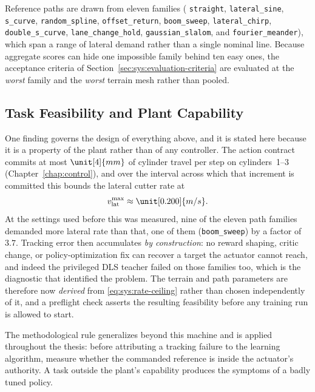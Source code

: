 Reference paths are drawn from eleven families ( \texttt{straight},
\texttt{lateral\_sine}, \texttt{s\_curve}, \texttt{random\_spline},
\texttt{offset\_return}, \texttt{boom\_sweep}, \texttt{lateral\_chirp},
\texttt{double\_s\_curve}, \texttt{lane\_change\_hold},
\texttt{gaussian\_slalom}, and \texttt{fourier\_meander}),
which span
a range of lateral demand rather than a single nominal line. Because
aggregate scores can hide one impossible family behind ten easy ones,
the acceptance criteria of
Section~\ref{sec:sys:evaluation-criteria} are evaluated at the
\emph{worst} family and the \emph{worst} terrain mesh rather than pooled.

\subsection{Task Feasibility and Plant Capability}
\label{sec:sys:capability}

One finding governs the design of everything above, and it is stated
here because it is a property of the plant rather than of any
controller. The action contract commits at most $\unit[4]{mm}$ of
cylinder travel per step on cylinders~1--3
(Chapter~\ref{chap:control}), and over the interval across which that
increment is committed this bounds the lateral cutter rate at
%
\begin{equation}
  \label{eq:sys:rate-ceiling}
  v_{\mathrm{lat}}^{\max} \approx \unit[0.200]{m/s}.
\end{equation}
%
At the settings used before this was measured, nine of the
eleven path families demanded more lateral rate than that, one of them
(\texttt{boom\_sweep}) by a factor of $3.7$. Tracking error then
accumulates \emph{by construction}: no reward shaping, critic change, or
policy-optimization fix can recover a target the actuator cannot reach,
and indeed the privileged DLS teacher failed on those families too,
which is the diagnostic that identified the problem. The terrain and
path parameters are therefore now \emph{derived} from
\eqref{eq:sys:rate-ceiling} rather than chosen independently of it, and
a preflight check asserts the resulting feasibility before any training
run is allowed to start.

The methodological rule generalizes beyond this machine and is applied
throughout the thesis: before attributing a tracking failure to the
learning algorithm, measure whether the commanded reference is inside
the actuator's authority. A task outside the plant's capability produces the symptoms of a badly tuned policy.

